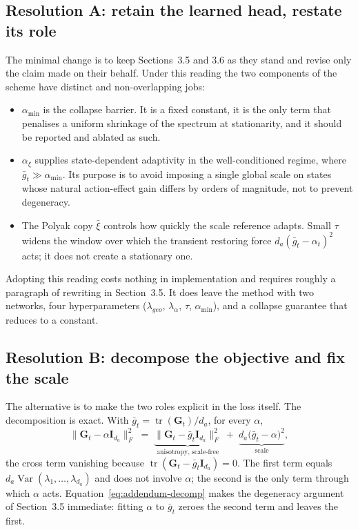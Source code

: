 ﻿\documentclass{article}
\begin{document}
\subsection{Resolution A: retain the learned head, restate its role}
\label{sec:addendum-optionA}

The minimal change is to keep Sections~3.5 and 3.6 as they stand and revise
only the claim made on their behalf. Under this reading the two components of
the scheme have distinct and non-overlapping jobs:

\begin{itemize}
  \item $\alpha_{\min}$ is the collapse barrier. It is a fixed constant, it is
        the only term that penalises a uniform shrinkage of the spectrum at
        stationarity, and it should be reported and ablated as such.
  \item $\alpha_\xi$ supplies state-dependent adaptivity in the
        well-conditioned regime, where $\bar g_t\gg\alpha_{\min}$. Its purpose
        is to avoid imposing a single global scale on states whose natural
        action-effect gain differs by orders of magnitude, not to prevent
        degeneracy.
  \item The Polyak copy $\bar\xi$ controls how quickly the scale reference
        adapts. Small $\tau$ widens the window over which the transient
        restoring force $d_a(\bar g_t-\alpha_t)^2$ acts; it does not create a
        stationary one.
\end{itemize}

Adopting this reading costs nothing in implementation and requires roughly a
paragraph of rewriting in Section~3.5. It does leave the method with two
networks, four hyperparameters ($\lambda_{geo}$, $\lambda_\alpha$, $\tau$,
$\alpha_{\min}$), and a collapse guarantee that reduces to a constant.

\subsection{Resolution B: decompose the objective and fix the scale}
\label{sec:addendum-optionB}

The alternative is to make the two roles explicit in the loss itself. The
decomposition is exact. With $\bar g_t=\operatorname{tr}(\mathbf{G}_t)/d_a$,
for every $\alpha$,
\begin{equation}
  \bigl\|\mathbf{G}_t-\alpha\mathbf{I}_{d_a}\bigr\|_F^2
  \;=\;
  \underbrace{\bigl\|\mathbf{G}_t-\bar g_t\mathbf{I}_{d_a}\bigr\|_F^2}_{\text{anisotropy, scale-free}}
  \;+\;
  \underbrace{d_a\bigl(\bar g_t-\alpha\bigr)^2}_{\text{scale}},
  \label{eq:addendum-decomp}
\end{equation}
the cross term vanishing because
$\operatorname{tr}(\mathbf{G}_t-\bar g_t\mathbf{I}_{d_a})=0$. The first term
equals $d_a\operatorname{Var}(\lambda_1,\dots,\lambda_{d_a})$ and does not
involve $\alpha$; the second is the only term through which $\alpha$ acts.
Equation~\eqref{eq:addendum-decomp} makes the degeneracy argument of
Section~3.5 immediate: fitting $\alpha$ to $\bar g_t$ zeroes the second term
and leaves the first.
\end{document}
